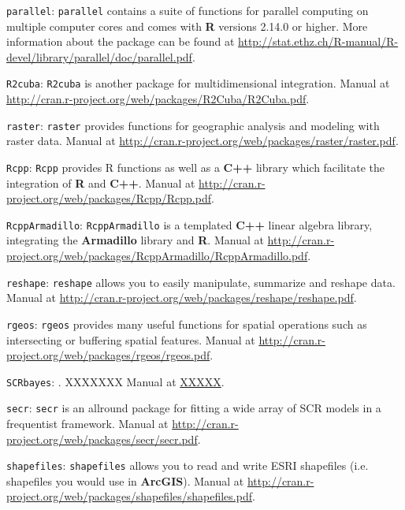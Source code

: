  {\flushleft \tt parallel}:
\mbox{\tt parallel} contains a suite of functions for parallel computing on multiple computer cores and comes with {\bf R} versions 2.14.0 or higher. More information about the package can be found at \url{http://stat.ethz.ch/R-manual/R-devel/library/parallel/doc/parallel.pdf}. 

 {\flushleft \tt R2cuba}: 
\mbox{\tt R2cuba} \citep{hahn_etal:2011} is another package for multidimensional integration. Manual at \url{http://cran.r-project.org/web/packages/R2Cuba/R2Cuba.pdf}. 

 {\flushleft \tt raster}: 
\mbox{\tt raster} \citep{hijmans_vanetten:2012} provides functions for geographic analysis and modeling with raster data. Manual at \url{http://cran.r-project.org/web/packages/raster/raster.pdf}. 

 {\flushleft \tt Rcpp}: 
\mbox{\tt Rcpp} \citep{eddelbuettel_francois:2011} provides R functions as well as a {\bf C++} library which facilitate the integration of {\bf R} and {\bf C++}. Manual at \url{http://cran.r-project.org/web/packages/Rcpp/Rcpp.pdf}. 

 {\flushleft \tt RcppArmadillo}:
\mbox{\tt RcppArmadillo} \citep{francois_etal:2011} is a templated {\bf C++} linear algebra library, integrating the {\bf Armadillo} library and {\bf R}. Manual at \url{http://cran.r-project.org/web/packages/RcppArmadillo/RcppArmadillo.pdf}. 

 {\flushleft \tt reshape}:
\mbox{\tt reshape} \citep{wickham_hadley:2007} allows you to easily manipulate, summarize and reshape data. Manual at \url{http://cran.r-project.org/web/packages/reshape/reshape.pdf}. 
  
{\flushleft \tt rgeos}: 
\mbox{\tt rgeos} \citep{bivand_rundel:2011} provides many useful functions for spatial operations such as intersecting or buffering spatial features. Manual at \url{http://cran.r-project.org/web/packages/rgeos/rgeos.pdf}. 

 {\flushleft \tt SCRbayes}:
\citep{russell_etal:2012}. XXXXXXX Manual at \url{XXXXX}.

{\flushleft \tt secr}:
\mbox{\tt secr} \citep{efford_etal:2009euring} is an allround package for fitting a wide array of SCR models in a frequentist framework. Manual at \url{http://cran.r-project.org/web/packages/secr/secr.pdf}.

{\flushleft \tt shapefiles}: 
\mbox{\tt shapefiles} \citep{stabler:2006} allows you to read and write ESRI shapefiles (i.e. shapefiles you would use in {\bf ArcGIS}). Manual at \url{http://cran.r-project.org/web/packages/shapefiles/shapefiles.pdf}. 

